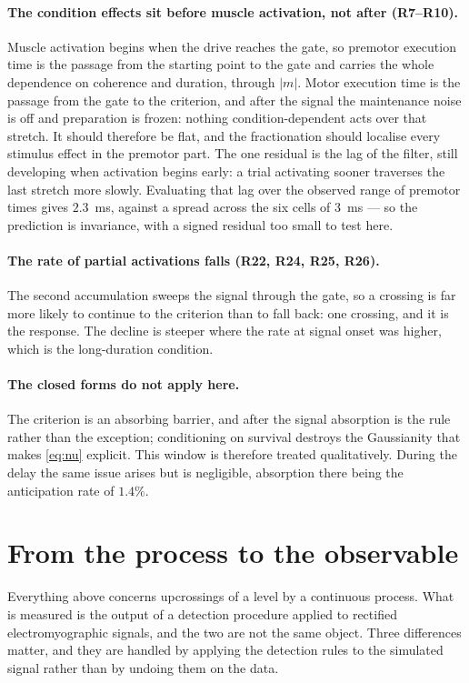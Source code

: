 \documentclass[a4paper,11pt]{article}
\newcommand{\1}{\mathbbm{1}}
\begin{document}
\paragraph{The condition effects sit before muscle activation, not after (R7--R10).}
Muscle activation begins when the drive reaches the gate, so premotor execution time is
the passage from the starting point to the gate and carries the whole dependence on
coherence and duration, through $|m|$. Motor execution time is the passage from the gate
to the criterion, and after the signal the maintenance noise is off and preparation is
frozen: nothing condition-dependent acts over that stretch. It should therefore be flat,
and the fractionation should localise every stimulus effect in the premotor part. The one
residual is the lag of the filter, still developing when activation begins early: a trial
activating sooner traverses the last stretch more slowly. Evaluating that lag over the
observed range of premotor times gives $2.3$~ms, against a spread across the six cells of
$3$~ms --- so the prediction is invariance, with a signed residual too small to test here.

\paragraph{The rate of partial activations falls (R22, R24, R25, R26).} The second
accumulation sweeps the signal through the gate, so a crossing is far more likely to
continue to the criterion than to fall back: one crossing, and it is the response. The
decline is steeper where the rate at signal onset was higher, which is the long-duration
condition.

\paragraph{The closed forms do not apply here.} The criterion is an absorbing barrier, and
after the signal absorption is the rule rather than the exception; conditioning on
survival destroys the Gaussianity that makes \eqref{eq:nu} explicit. This window is
therefore treated qualitatively. During the delay the same issue arises but is negligible,
absorption there being the anticipation rate of $1.4\%$.

\section{From the process to the observable}
\label{sec:map}

Everything above concerns upcrossings of a level by a continuous process. What is
measured is the output of a detection procedure applied to rectified electromyographic
signals, and the two are not the same object. Three differences matter, and they are
handled by applying the detection rules to the simulated signal rather than by undoing
them on the data.
\end{document}

